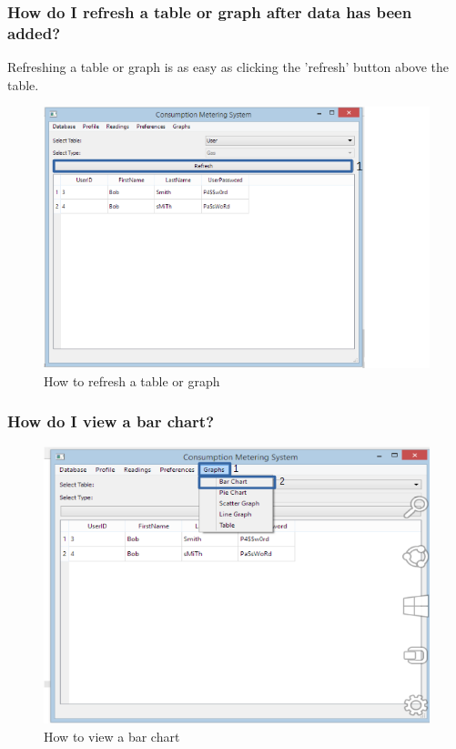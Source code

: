 \subsubsection{How do I refresh a table or graph after data has been added?}\label{question:refresh_table}
Refreshing a table or graph is as easy as clicking the 'refresh' button above the table.
\begin{figure}[H]
	\includegraphics{./manual/images/refresh_table.png}
	\caption{How to refresh a table or graph}
\end{figure}

\subsubsection{How do I view a bar chart?}\label{question:bar_chart}
\begin{figure}[H]
	\includegraphics{./manual/images/display_bar_chart.png}
	\caption{How to view a bar chart}
\end{figure}

